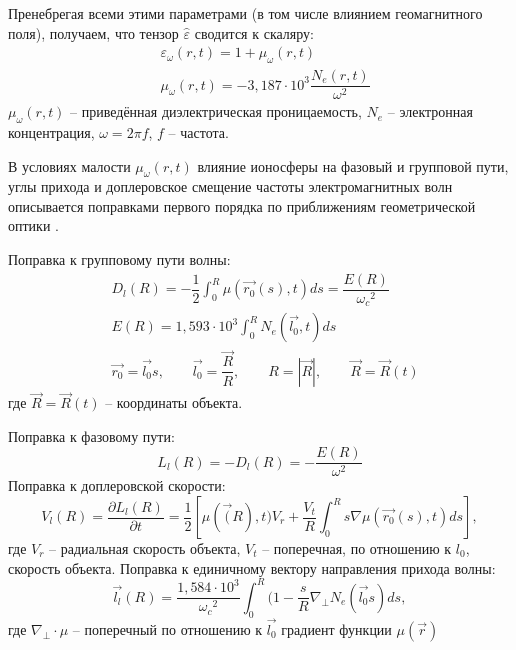 Пренебрегая всеми этими параметрами (в том числе влиянием геомагнитного поля), получаем, что тензор 
$\hat{\varepsilon}$ сводится к скаляру:
\begin{equation*}
	\begin{split}
		& \varepsilon_\omega (r, t) = 1 + \mu_\omega (r,t) \\
		& \mu_\omega(r,t) = -3,187 \cdot 10^3 \dfrac{N_e (r,t)}{\omega^2}
	\end{split}
\end{equation*}
$\mu_\omega(r,t)$ -- приведённая диэлектрическая проницаемость, $N_e$ -- электронная концентрация, 
$\omega = 2\pi f$, $f$ -- частота.

В условиях малости $\mu_\omega(r,t)$ влияние ионосферы на фазовый и групповой пути, углы прихода и доплеровское
смещение частоты электромагнитных волн описывается поправками первого порядка по приближениям 
геометрической оптики \cite{Kravcov, NeQuick, Gackovskiy}.

Поправка к групповому пути волны:
\begin{equation} \label{eq_distance}
	\begin{split}
		& D_l (R) = -\dfrac{1}{2} \int_{0}^{R} \mu(\vec{r_0}(s), t) ds = \dfrac{E(R)}{{\omega_c}^2} \\
		& E(R) = 1,593 \cdot 10^3 \int_{0}^R N_e(\vec{l_0}, t) ds \\
		& \vec{r_0} = \vec{l_0}s, \qquad 
		\vec{l_0} = \dfrac{\vec{R}}{R}, 
			\qquad R = |\vec{R}|, 
			\qquad \vec{R} = \vec{R}(t)
	\end{split}
\end{equation}
где $\vec{R} = \vec{R}(t)$ -- координаты объекта.

Поправка к фазовому пути:
\begin{equation*}
	L_l(R) = -D_l(R) = -\dfrac{E(R)}{\omega^2}
\end{equation*}
Поправка к доплеровской скорости:
\begin{equation*}
	V_l(R) = \dfrac{\partial{L_l}(R)}{\partial{t}} = \dfrac{1}{2}[\mu(\vec(R), t) V_r + \dfrac{V_t}{R}
		\int_{0}^{R} s \nabla \mu(\vec{r_0}(s), t) ds],
\end{equation*}
где $V_r$ -- радиальная скорость объекта, $V_t$ -- поперечная, по отношению к $l_0$, скорость объекта.
Поправка к единичному вектору направления прихода волны:
\begin{equation} \label{eq_angle}
	\vec{l_l}(R) = \dfrac{1,584 \cdot 10^3}{{\omega_c}^2} 
		\int_{0}^{R} (1 - \dfrac{s}{R} \nabla_{\perp} N_e(\vec{l_0}s) ds,
\end{equation}
где $\nabla_\perp \cdot \mu$ -- поперечный по отношению к $\vec{l_0}$ градиент функции $\mu(\vec{r})$